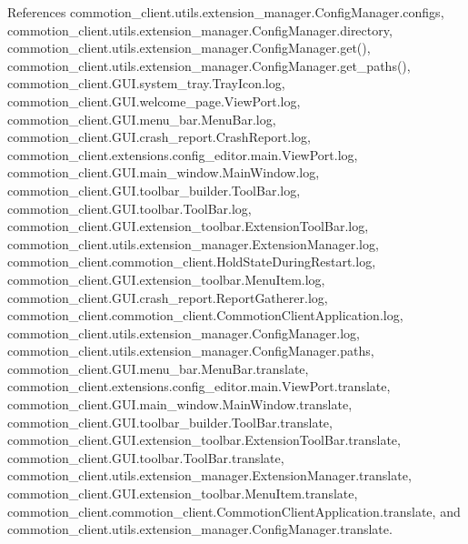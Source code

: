 References commotion\+\_\+client.\+utils.\+extension\+\_\+manager.\+Config\+Manager.\+configs, commotion\+\_\+client.\+utils.\+extension\+\_\+manager.\+Config\+Manager.\+directory, commotion\+\_\+client.\+utils.\+extension\+\_\+manager.\+Config\+Manager.\+get(), commotion\+\_\+client.\+utils.\+extension\+\_\+manager.\+Config\+Manager.\+get\+\_\+paths(), commotion\+\_\+client.\+G\+U\+I.\+system\+\_\+tray.\+Tray\+Icon.\+log, commotion\+\_\+client.\+G\+U\+I.\+welcome\+\_\+page.\+View\+Port.\+log, commotion\+\_\+client.\+G\+U\+I.\+menu\+\_\+bar.\+Menu\+Bar.\+log, commotion\+\_\+client.\+G\+U\+I.\+crash\+\_\+report.\+Crash\+Report.\+log, commotion\+\_\+client.\+extensions.\+config\+\_\+editor.\+main.\+View\+Port.\+log, commotion\+\_\+client.\+G\+U\+I.\+main\+\_\+window.\+Main\+Window.\+log, commotion\+\_\+client.\+G\+U\+I.\+toolbar\+\_\+builder.\+Tool\+Bar.\+log, commotion\+\_\+client.\+G\+U\+I.\+toolbar.\+Tool\+Bar.\+log, commotion\+\_\+client.\+G\+U\+I.\+extension\+\_\+toolbar.\+Extension\+Tool\+Bar.\+log, commotion\+\_\+client.\+utils.\+extension\+\_\+manager.\+Extension\+Manager.\+log, commotion\+\_\+client.\+commotion\+\_\+client.\+Hold\+State\+During\+Restart.\+log, commotion\+\_\+client.\+G\+U\+I.\+extension\+\_\+toolbar.\+Menu\+Item.\+log, commotion\+\_\+client.\+G\+U\+I.\+crash\+\_\+report.\+Report\+Gatherer.\+log, commotion\+\_\+client.\+commotion\+\_\+client.\+Commotion\+Client\+Application.\+log, commotion\+\_\+client.\+utils.\+extension\+\_\+manager.\+Config\+Manager.\+log, commotion\+\_\+client.\+utils.\+extension\+\_\+manager.\+Config\+Manager.\+paths, commotion\+\_\+client.\+G\+U\+I.\+menu\+\_\+bar.\+Menu\+Bar.\+translate, commotion\+\_\+client.\+extensions.\+config\+\_\+editor.\+main.\+View\+Port.\+translate, commotion\+\_\+client.\+G\+U\+I.\+main\+\_\+window.\+Main\+Window.\+translate, commotion\+\_\+client.\+G\+U\+I.\+toolbar\+\_\+builder.\+Tool\+Bar.\+translate, commotion\+\_\+client.\+G\+U\+I.\+extension\+\_\+toolbar.\+Extension\+Tool\+Bar.\+translate, commotion\+\_\+client.\+G\+U\+I.\+toolbar.\+Tool\+Bar.\+translate, commotion\+\_\+client.\+utils.\+extension\+\_\+manager.\+Extension\+Manager.\+translate, commotion\+\_\+client.\+G\+U\+I.\+extension\+\_\+toolbar.\+Menu\+Item.\+translate, commotion\+\_\+client.\+commotion\+\_\+client.\+Commotion\+Client\+Application.\+translate, and commotion\+\_\+client.\+utils.\+extension\+\_\+manager.\+Config\+Manager.\+translate.


